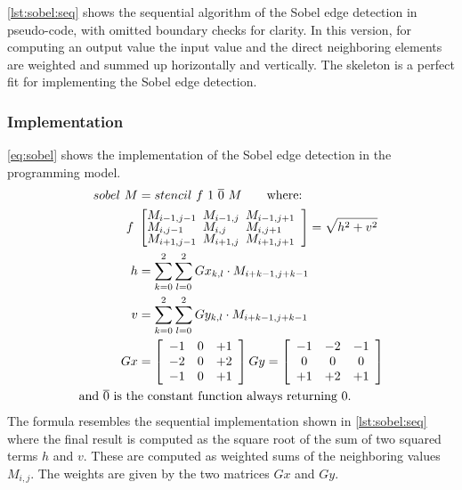 \autoref{lst:sobel:seq} shows the sequential algorithm of the Sobel edge detection in pseudo-code, with omitted boundary checks for clarity.
In this version, for computing an output value  the input value  and the direct neighboring elements are weighted and summed up horizontally and vertically.
The \stencil skeleton is a perfect fit for implementing the Sobel edge detection.

\subsubsection*{\SkelCL Implementation}
\autoref{eq:sobel} shows the implementation of the Sobel edge detection in the \SkelCL programming model.
\begin{align}
  \label{eq:sobel}
  sobel\ M& = stencil\ f\ 1\ \overline{0}\ M \qquad\text{where:}\\
  f\ &\left[\begin{array}{lll}%
      \hspace{-.5em} M_{i-1,j-1}& \hspace{-.5em} M_{i-1,j} & \hspace{-.5em}M_{i-1,j+1}\vspace{-.25em}\\%
      \hspace{-.5em} M_{i,j-1}& \hspace{-.5em} M_{i,j} & \hspace{-.5em}M_{i,j+1}\vspace{-.25em}\\%
      \hspace{-.5em} M_{i+1,j-1}& \hspace{-.5em} M_{i+1,j} & \hspace{-.5em}M_{i+1,j+1}
    \end{array}\right] = \displaystyle\sqrt{ h^2 + v^2 }\nonumber\\
  h & = \sum_{k=0}^2 \sum_{l=0}^2 Gx_{k, l}\cdot M_{i+k-1,j+k-1}\nonumber\\
  v & = \sum_{k=0}^2 \sum_{l=0}^2 Gy_{k, l}\cdot M_{i+k-1,j+k-1}\nonumber\\
  Gx& = \left[\begin{array}{ccc}%
      -1&0&+1\\
      -2&0&+2\\
      -1&0&+1
    \end{array}\right]
  Gy = \left[\begin{array}{ccc}%
      -1&-2&-1\\
      0&0&0\\
      +1&+2&+1
    \end{array}\right] \nonumber\\
  \text{and } \overline{0} \text{ is th}&\text{e constant function always returning $0$.}\nonumber
\end{align}
The formula resembles the sequential implementation shown in \autoref{lst:sobel:seq} where the final result is computed as the square root of the sum of two squared terms $h$ and $v$.
These are computed as weighted sums of the neighboring values $M_{i,j}$.
The weights are given by the two matrices $Gx$ and $Gy$.

